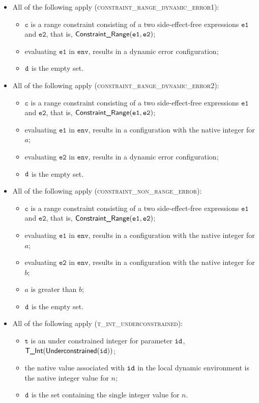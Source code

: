 \documentclass{book}
\newcommand\env[0]{\texttt{env}}
\newcommand\vc[0]{\texttt{c}}
\newcommand\vt[0]{\texttt{t}}
\newcommand\veone[0]{\texttt{e1}}
\newcommand\vetwo[0]{\texttt{e2}}
\begin{document}
\begin{itemize}
  \item All of the following apply (\textsc{constraint\_range\_dynamic\_error1}):
  \begin{itemize}
    \item $\vc$ is a range constraint consisting of a two side-effect-free expressions $\veone$ and $\vetwo$, that is, $\ConstraintRange(\veone, \vetwo)$;
    \item evaluating $\veone$ in $\env$, results in a dynamic error configuration;
    \item $\texttt{d}$ is the empty set.
  \end{itemize}

  \item All of the following apply (\textsc{constraint\_range\_dynamic\_error2}):
  \begin{itemize}
    \item $\vc$ is a range constraint consisting of a two side-effect-free expressions $\veone$ and $\vetwo$, that is, $\ConstraintRange(\veone, \vetwo)$;
    \item evaluating $\veone$ in $\env$, results in a configuration with the native integer for $a$;
    \item evaluating $\vetwo$ in $\env$, results in a dynamic error configuration;
    \item $\texttt{d}$ is the empty set.
  \end{itemize}

  \item All of the following apply (\textsc{constraint\_non\_range\_error}):
  \begin{itemize}
    \item $\vc$ is a range constraint consisting of a two side-effect-free expressions $\veone$ and $\vetwo$, that is, $\ConstraintRange(\veone, \vetwo)$;
    \item evaluating $\veone$ in $\env$, results in a configuration with the native integer for $a$;
    \item evaluating $\vetwo$ in $\env$, results in a configuration with the native integer for $b$;
    \item $a$ is greater than $b$;
    \item $\texttt{d}$ is the empty set.
  \end{itemize}

  \item All of the following apply (\textsc{t\_int\_underconstrained}):
  \begin{itemize}
    \item $\vt$ is an under constrained integer for parameter $\texttt{id}$, \\ $\textsf{T\_Int}(\textsf{Underconstrained}(\texttt{id}))$;
    \item the native value associated with $\texttt{id}$ in the local dynamic environment is the native integer value for $n$;
    \item $\texttt{d}$ is the set containing the single integer value for $n$.
  \end{itemize}


\end{itemize}
\end{document}
